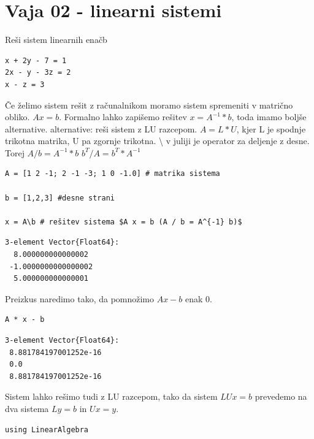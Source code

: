 \documentclass[12pt,a4paper]{article}
\begin{document}
\section{Vaja 02 - linearni sistemi}

Reši sistem linearnih enačb

\begin{verbatim}
x + 2y - 7 = 1
2x - y - 3z = 2
x - z = 3
\end{verbatim}
Če želimo sistem rešit z računalnikom moramo sistem spremeniti v matrično obliko. $Ax = b$. Formalno lahko zapišemo rešitev $x = A^{-1} * b$, toda imamo boljše alternative. alternative: reši sistem z LU razcepom. $A = L*U$, kjer L je spodnje trikotna matrika, U pa zgornje trikotna. {\textbackslash} v juliji je operator za deljenje z desne. Torej $A / b = A^{-1} * b$ $b^T / A = b^T * A^{-1}$


\begin{verbatim}
A = [1 2 -1; 2 -1 -3; 1 0 -1.0] # matrika sistema

b = [1,2,3] #desne strani

x = A\b # rešitev sistema $A x = b (A / b = A^{-1} b)$
\end{verbatim}
\begin{verbatim}
3-element Vector{Float64}:
  8.000000000000002
 -1.0000000000000002
  5.000000000000001
\end{verbatim}

Preizkus naredimo tako, da pomnožimo $Ax - b$ enak 0.


\begin{verbatim}
A * x - b
\end{verbatim}
\begin{verbatim}
3-element Vector{Float64}:
 8.881784197001252e-16
 0.0
 8.881784197001252e-16
\end{verbatim}

Sistem lahko rešimo tudi z LU razcepom, tako da sistem $LUx = b$ prevedemo na dva sistema $Ly=b$ in $Ux = y$.


\begin{verbatim}
using LinearAlgebra
\end{verbatim}
\end{document}
